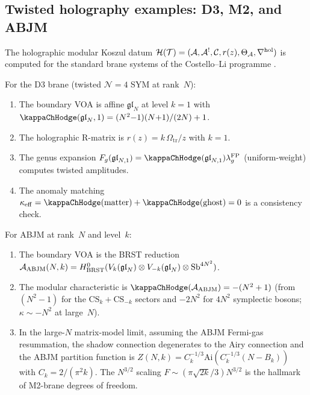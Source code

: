 %
%

\subsection{Twisted holography examples: D3, M2, and ABJM}
\label{subsec:holographic-twisted-examples}

The holographic modular Koszul datum
$\mathcal{H}(\mathcal{T})
= (\mathcal{A}, \mathcal{A}^!, \mathcal{C}, r(z), \Theta_{\mathcal{A}},
\nabla^{\mathrm{hol}})$
is computed for the standard brane systems of the
Costello--Li programme \cite{CL16,CostelloGaiotto18}.

\begin{proposition}[Twisted $\mathcal{N} = 4$ SYM datum]
\label{prop:twisted-n4-datum}
For the D3 brane \textup{(}twisted $\mathcal{N} = 4$ SYM
at rank~$N$\textup{)}:
\begin{enumerate}[label=\textup{(\roman*)}]
\item The boundary VOA is affine $\mathfrak{gl}_N$ at level $k = 1$
 with $\kappaChHodge(\mathfrak{gl}_N, 1)
 = (N^2{-}1)(N{+}1)/(2N) + 1$.
\item The holographic R-matrix is $r(z) = k\,\Omega_{\mathrm{tr}}/z$
 with $k = 1$.
\item The genus expansion
 \(F_g(\mathfrak{gl}_{N,1})
 = \kappaChHodge(\mathfrak{gl}_{N,1})\lambda_g^{\mathrm{FP}}\)
 \textup{(}uniform-weight\textup{)} computes twisted amplitudes.
\item The anomaly matching
 $\kappa_{\mathrm{eff}} = \kappaChHodge(\mathrm{matter})
 + \kappaChHodge(\mathrm{ghost}) = 0$
 is a consistency check.
\end{enumerate}
\end{proposition}

\begin{proposition}
\label{prop:abjm-datum}
For ABJM at rank~$N$ and level~$k$:
\begin{enumerate}[label=\textup{(\roman*)}]
\item The boundary VOA is the BRST reduction
 $\mathcal{A}_{\mathrm{ABJM}}(N,k)
 = H^0_{\mathrm{BRST}}(V_k(\mathfrak{gl}_N) \otimes
 V_{-k}(\mathfrak{gl}_N) \otimes \mathrm{Sb}^{4N^2})$.
\item The modular characteristic is
 $\kappaChHodge(\cA_{\mathrm{ABJM}}) = -(N^2+1)$
 \textup{(}from $(N^2{-}1)$ for the $\mathrm{CS}_k + \mathrm{CS}_{-k}$
 sectors and $-2N^2$ for $4N^2$ symplectic bosons;
 $\kappa \sim -N^2$ at large~$N$\textup{)}.
\item In the large-$N$ matrix-model limit, assuming the ABJM
 Fermi-gas resummation, the shadow connection degenerates
 to the Airy connection and the ABJM partition function is
 $Z(N,k) = C_k^{-1/3}\mathrm{Ai}(C_k^{-1/3}(N - B_k))$
 with $C_k = 2/(\pi^2 k)$.
 The $N^{3/2}$ scaling
 $F \sim (\pi\sqrt{2k}/3)N^{3/2}$ is the hallmark
 of M2-brane degrees of freedom.
\end{enumerate}
\end{proposition}

